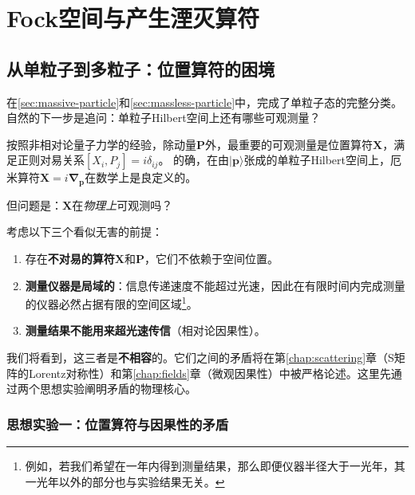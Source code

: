 
\section{Fock空间与产生湮灭算符}
\subsection{从单粒子到多粒子：位置算符的困境}\label{sec:position-contradiction}

在\ref{sec:massive-particle}和\ref{sec:massless-particle}中，完成了单粒子态的完整分类。
自然的下一步是追问：单粒子Hilbert空间上还有哪些可观测量？

按照非相对论量子力学的经验，除动量$\boldsymbol{P}$外，最重要的可观测量是位置算符$\boldsymbol{X}$，满足正则对易关系$[X_i, P_j] = i\delta_{ij}$。
的确，在由$|\boldsymbol{p}\rangle$张成的单粒子Hilbert空间上，厄米算符$\boldsymbol{X} = i\boldsymbol{\nabla}_{\boldsymbol{p}}$在数学上是良定义的。

但问题是：$\boldsymbol{X}$在\emph{物理上}可观测吗？

考虑以下三个看似无害的前提：
\begin{enumerate}
    \item 存在\textbf{不对易的算符}$\boldsymbol{X}$和$\boldsymbol{P}$，它们不依赖于空间位置。
    \item \textbf{测量仪器是局域的}：信息传递速度不能超过光速，因此在有限时间内完成测量的仪器必然占据有限的空间区域\footnote{例如，若我们希望在一年内得到测量结果，那么即便仪器半径大于一光年，其一光年以外的部分也与实验结果无关。}。
    \item \textbf{测量结果不能用来超光速传信}（相对论因果性）。
\end{enumerate}
我们将看到，这三者是\textbf{不相容}的。它们之间的矛盾将在第\ref{chap:scattering}章（S矩阵的Lorentz对称性）和第\ref{chap:fields}章（微观因果性）中被严格论述。这里先通过两个思想实验阐明矛盾的物理核心。

\subsubsection*{思想实验一：位置算符与因果性的矛盾}

